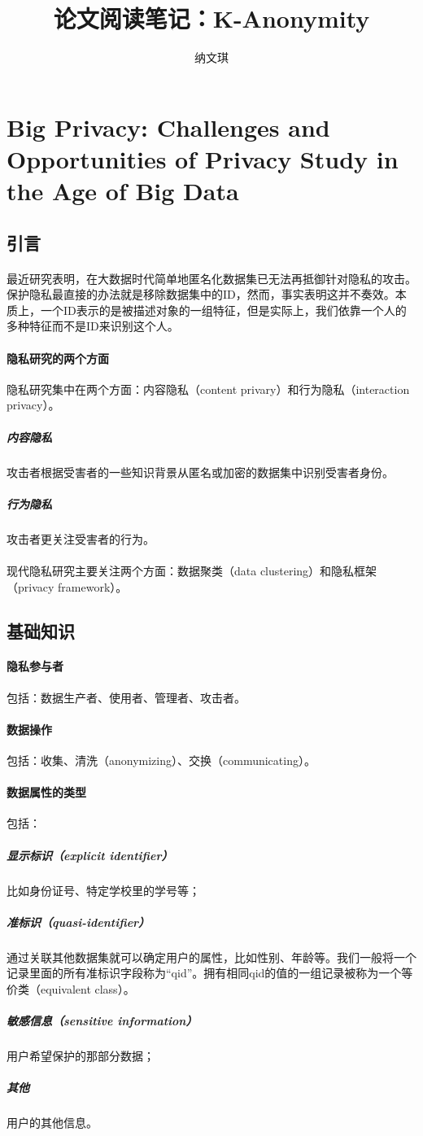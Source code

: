 \documentclass[12pt,a4paper]{article}
\begin{document}

\title{论文阅读笔记：K-Anonymity}
\author{纳文琪}
\maketitle


\section{Big Privacy: Challenges and Opportunities of Privacy Study in the Age of Big Data\cite{yu2016big}}

\subsection{引言}
\paragraph{} 最近研究表明，在大数据时代简单地匿名化数据集已无法再抵御针对隐私的攻击。保护隐私最直接的办法就是移除数据集中的ID，然而，事实表明这并不奏效。本质上，一个ID表示的是被描述对象的一组特征，但是实际上，我们依靠一个人的多种特征而不是ID来识别这个人。
\paragraph{隐私研究的两个方面} 隐私研究集中在两个方面：内容隐私（content privary）和行为隐私（interaction privacy）。
	\subparagraph{内容隐私} 攻击者根据受害者的一些知识背景从匿名或加密的数据集中识别受害者身份。
	\subparagraph{行为隐私} 攻击者更关注受害者的行为。
\paragraph{} 现代隐私研究主要关注两个方面：数据聚类（data clustering）和隐私框架（privacy framework）。


\subsection{基础知识}
\paragraph{隐私参与者} 包括：数据生产者、使用者、管理者、攻击者。
\paragraph{数据操作} 包括：收集、清洗（anonymizing）、交换（communicating）。
\paragraph{数据属性的类型} 包括：
	\subparagraph{显示标识（explicit identifier）} 比如身份证号、特定学校里的学号等；
	\subparagraph{准标识（quasi-identifier）} 通过关联其他数据集就可以确定用户的属性，比如性别、年龄等。我们一般将一个记录里面的所有准标识字段称为“qid”。拥有相同qid的值的一组记录被称为一个等价类（equivalent class）。
	\subparagraph{敏感信息（sensitive information）} 用户希望保护的那部分数据；
	\subparagraph{其他} 用户的其他信息。
\end{document}
